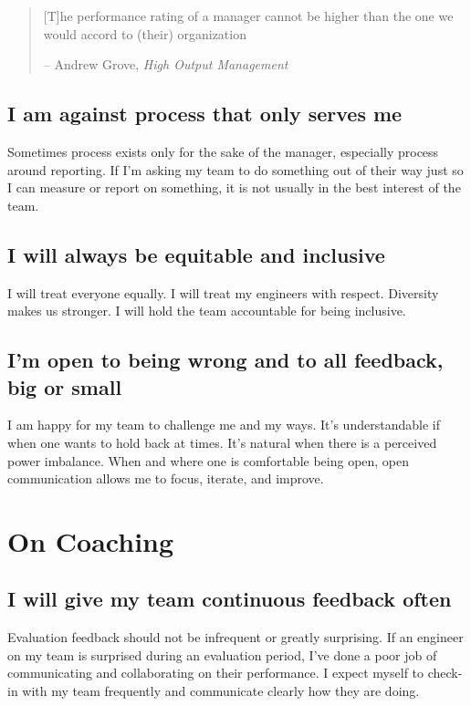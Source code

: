 \documentclass[11pt]{amsart}
\begin{document}
\begin{quote}
[T]he performance rating of a manager cannot be higher than the one we would accord to (their) organization

-- Andrew Grove, \emph{High Output Management}
\end{quote}

\subsection{I am against process that only serves me}
Sometimes process exists only for the sake of the manager, especially process around reporting. If I’m asking my team to do something out of their way just so I can measure or report on something, it is not usually in the best interest of the team.

\subsection{I will always be equitable and inclusive}
I will treat everyone equally. I will treat my engineers with respect. Diversity makes us stronger. I will hold the team accountable for being inclusive. 

\subsection{I'm open to being wrong and to all feedback, big or small}
I am happy for my team to challenge me and my ways. It’s understandable if when one wants to hold back at times. It’s natural when there is a perceived power imbalance. When and where one is comfortable being open, open communication allows me to focus, iterate, and improve.


\section{On Coaching} %

\subsection{I will give my team continuous feedback often} 
Evaluation feedback should not be infrequent or greatly surprising. If an engineer on my team is surprised during an evaluation period, I’ve done a poor job of communicating and collaborating on their performance. I expect myself to check-in with my team frequently and communicate clearly how they are doing.
\end{document}
